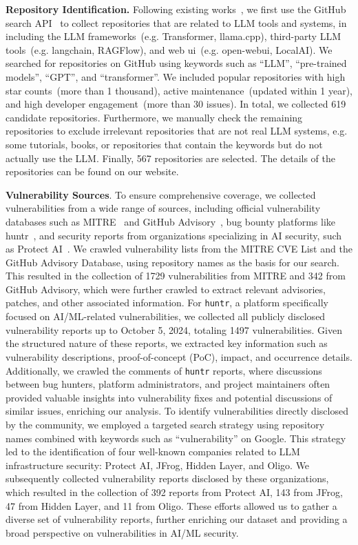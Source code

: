 \noindent \textbf{Repository Identification.} Following existing works~\cite{quan2022jsdl,chen2023dlframework,shen2021compiler,chen2021faults,johirul2019bug}, we first use the GitHub search API~\cite{githubsearch} to collect repositories that are related to LLM tools and systems, in including the LLM frameworks~(e.g. Transformer, llama.cpp), third-party LLM tools~(e.g. langchain, RAGFlow), and web ui~(e.g. open-webui, LocalAI). We searched for repositories on GitHub using keywords such as ``LLM'', ``pre-trained models'', ``GPT'', and ``transformer''. We included popular repositories with high star counts~(more than 1 thousand), active maintenance~(updated within 1 year), and high developer engagement~(more than 30 issues). In total, we collected 619 candidate repositories. Furthermore, we manually check the remaining repositories to exclude irrelevant repositories that are not real LLM systems, e.g. some tutorials, books, or repositories that contain the keywords but do not actually use the LLM. Finally, 567 repositories are selected. The details of the repositories can be found on our website.

\noindent \textbf{Vulnerability Sources}. To ensure comprehensive coverage, we collected vulnerabilities from a wide range of sources, including official vulnerability databases such as MITRE~\cite{mitre} and GitHub Advisory~\cite{advisory}, bug bounty platforms like huntr~\cite{huntr}, and security reports from organizations specializing in AI security, such as Protect AI~\cite{protectai}. We crawled vulnerability lists from the MITRE CVE List and the GitHub Advisory Database, using repository names as the basis for our search. This resulted in the collection of 1729 vulnerabilities from MITRE and 342 from GitHub Advisory, which were further crawled to extract relevant advisories, patches, and other associated information.
For \texttt{huntr}, a platform specifically focused on AI/ML-related vulnerabilities, we collected all publicly disclosed vulnerability reports up to October 5, 2024, totaling 1497 vulnerabilities. Given the structured nature of these reports, we extracted key information such as vulnerability descriptions, proof-of-concept (PoC), impact, and occurrence details. Additionally, we crawled the comments of \texttt{huntr} reports, where discussions between bug hunters, platform administrators, and project maintainers often provided valuable insights into vulnerability fixes and potential discussions of similar issues, enriching our analysis.
To identify vulnerabilities directly disclosed by the community, we employed a targeted search strategy using repository names combined with keywords such as ``vulnerability'' on Google. This strategy led to the identification of four well-known companies related to LLM infrastructure security: Protect AI, JFrog, Hidden Layer, and Oligo. We subsequently collected vulnerability reports disclosed by these organizations, which resulted in the collection of 392 reports from Protect AI, 143 from JFrog, 47 from Hidden Layer, and 11 from Oligo.
These efforts allowed us to gather a diverse set of vulnerability reports, further enriching our dataset and providing a broad perspective on vulnerabilities in AI/ML security.

